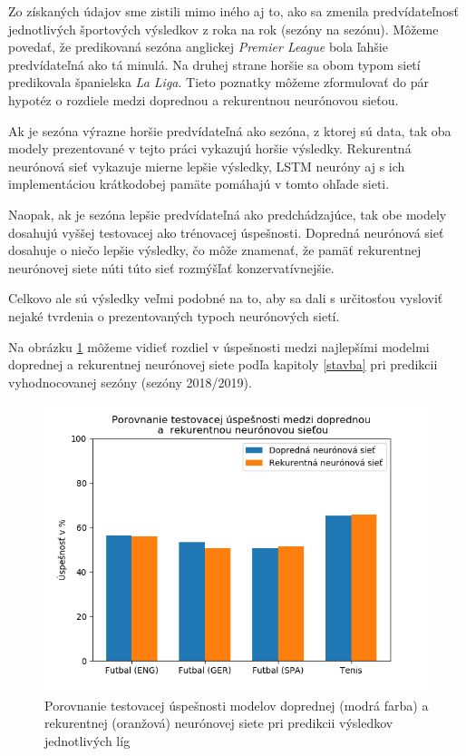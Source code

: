 Zo získaných údajov sme zistili mimo iného aj to, ako sa zmenila predvídateľnosť jednotlivých športových výsledkov z roka na rok (sezóny na sezónu).
Môžeme povedať, že pre\-dikovaná sezóna anglickej \textit{Premier League} bola ľahšie predvídateľná ako tá minulá. Na druhej strane horšie sa obom typom sietí pre\-dikovala španielska \textit{La Liga}. Tieto poznatky môžeme zformulovať do pár hypotéz o rozdiele medzi doprednou a rekurentnou neurónovou sieťou.

Ak je sezóna výrazne horšie predvídateľná ako sezóna, z ktorej sú data, tak oba modely prezentované v tejto práci vykazujú horšie výsledky. Rekurentná neurónová sieť vykazuje mierne lepšie výsledky, LSTM neuróny aj s ich implementáciou krátkodobej pamäte pomáhajú v tomto ohľade sieti.

Naopak, ak je sezóna lepšie predvídateľná ako predchádzajúce, tak obe modely dosahujú vyššej testovacej ako trénovacej úspešnosti. Dopredná neurónová sieť dosahuje o niečo lepšie výsledky, čo môže znamenať, že pamäť rekurentnej neurónovej siete núti túto sieť rozmýšľať konzervatívnejšie.

Celkovo ale sú výsledky veľmi podobné na to, aby sa dali s určitosťou vysloviť nejaké tvrdenia o prezentovaných typoch neurónových sietí.

Na obrázku \ref{fig20} môžeme vidieť rozdiel v úspešnosti medzi najlepšími modelmi doprednej a rekurentnej neurónovej siete podľa kapitoly \ref{stavba} pri pre\-dikcii vyhodnocovanej sezóny (sezóny 2018/2019).

\begin{figure}[t]
    \includegraphics[width=\textwidth]{../img/bars.png} 
    \caption{Porovnanie testovacej úspešnosti modelov doprednej (modrá farba) a rekurentnej (oranžová) neurónovej siete pri predikcii výsledkov jednotlivých líg}
    \label{fig20} 
\end{figure}